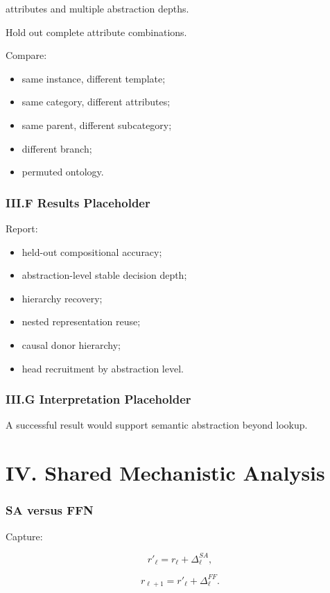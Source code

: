 \documentclass[10pt]{article}
\begin{document}
attributes and multiple abstraction depths.

Hold out complete attribute combinations.

Compare:

\begin{itemize}
\item same instance, different template;
\item same category, different attributes;
\item same parent, different subcategory;
\item different branch;
\item permuted ontology.
\end{itemize}

\section{III.F Results Placeholder}

Report:

\begin{itemize}
\item held-out compositional accuracy;
\item abstraction-level stable decision depth;
\item hierarchy recovery;
\item nested representation reuse;
\item causal donor hierarchy;
\item head recruitment by abstraction level.
\end{itemize}

\section{III.G Interpretation Placeholder}

A successful result would support semantic abstraction beyond lookup.

\part{IV. Shared Mechanistic Analysis}

\section{SA versus FFN}

Capture:

\[
r'_\ell=r_\ell+\Delta_\ell^{SA},
\]

\[
r_{\ell+1}=r'_\ell+\Delta_\ell^{FF}.
\]
\end{document}

